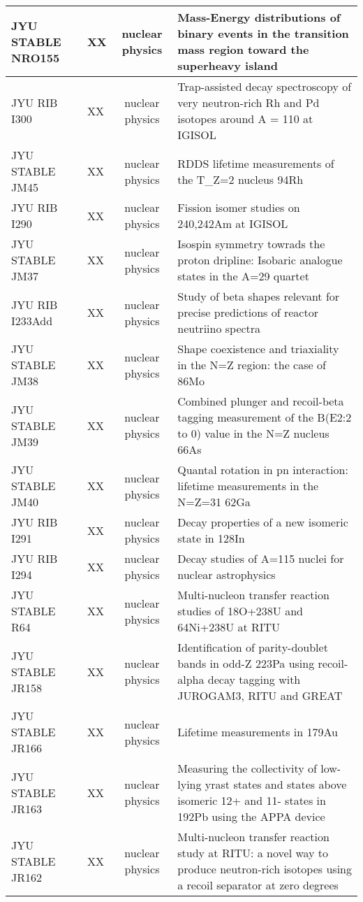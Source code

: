 \begin{xltabular}{\textwidth}{|l|p{0.12\textwidth}|c|Y|}
JYU STABLE NRO155 & XX & nuclear physics & Mass-Energy distributions of binary events in the transition mass region toward the superheavy island \\ \hline
JYU RIB I300 & XX & nuclear physics & Trap-assisted decay spectroscopy of very neutron-rich Rh and Pd isotopes around A = 110 at IGISOL \\ \hline
JYU STABLE JM45 & XX & nuclear physics & RDDS lifetime measurements of the T\_Z=2 nucleus 94Rh \\ \hline
JYU RIB I290 & XX & nuclear physics & Fission isomer studies on 240,242Am at IGISOL \\ \hline
JYU STABLE JM37 & XX & nuclear physics & Isospin symmetry towrads the proton dripline: Isobaric analogue states in the A=29 quartet \\ \hline
JYU RIB I233Add & XX & nuclear physics & Study of beta shapes relevant for precise predictions of reactor neutriino spectra \\ \hline
JYU STABLE JM38 & XX & nuclear physics & Shape coexistence and triaxiality in the N=Z region: the case of 86Mo \\ \hline
JYU STABLE JM39 & XX & nuclear physics & Combined plunger and recoil-beta tagging measurement of the B(E2:2 to 0) value in the N=Z nucleus 66As \\ \hline
JYU STABLE JM40 & XX & nuclear physics & Quantal rotation in pn interaction: lifetime measurements in the N=Z=31 62Ga \\ \hline
JYU RIB I291 & XX & nuclear physics & Decay properties of a new isomeric state in 128In \\ \hline
JYU RIB I294 & XX & nuclear physics & Decay studies of A=115 nuclei for nuclear astrophysics \\ \hline
JYU STABLE R64 & XX & nuclear physics & Multi-nucleon transfer reaction studies of 18O+238U and 64Ni+238U at RITU \\ \hline
JYU STABLE JR158 & XX & nuclear physics & Identification of parity-doublet bands in odd-Z 223Pa using recoil-alpha decay tagging with JUROGAM3, RITU and GREAT\\ \hline
JYU STABLE JR166 & XX & nuclear physics & Lifetime measurements in 179Au \\ \hline
JYU STABLE JR163 & XX & nuclear physics & Measuring the collectivity of low-lying yrast states and states above isomeric 12+ and 11- states in 192Pb using the APPA device\\ \hline
JYU STABLE JR162 & XX & nuclear physics & Multi-nucleon transfer reaction study at RITU: a novel way to produce neutron-rich isotopes using a recoil separator at zero degrees \\ \hline

\end{xltabular}
